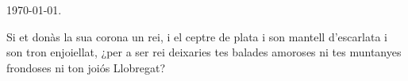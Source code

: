 \documentclass{minimal}
\begin{document}
\today.

\begin{minipage}{1sp}
\obeylines
Si et donàs la sua corona
un rei, i el ceptre de plata
i son mantell d’escarlata
i son tron enjoiellat,
¿per a ser rei deixaries
tes balades amoroses
ni tes muntanyes frondoses
ni ton joiós Llobregat?
\end{minipage}
\end{document}
